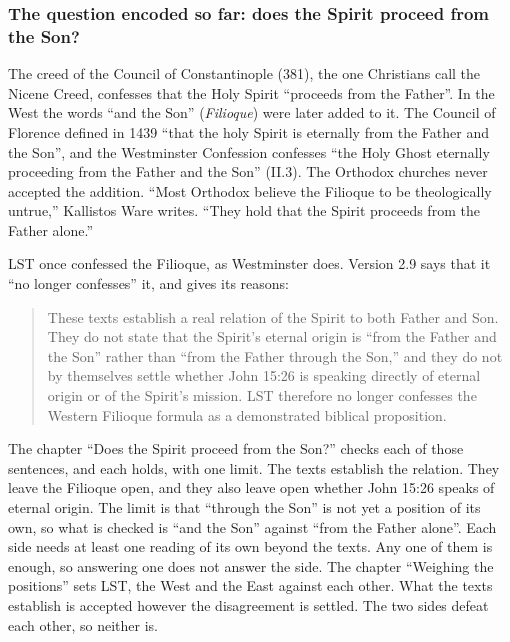 \documentclass[11pt,paper=\testimonypaper,DIV=13,parskip=false]{scrartcl}
\begin{document}
\subsubsection*{The question encoded so far: does the Spirit proceed from the Son?}
The creed of the Council of Constantinople (381), the one Christians call the Nicene Creed, confesses that the Holy Spirit “proceeds from the Father”. In the West the words “and the Son” (\emph{Filioque}) were later added to it. The Council of Florence defined in 1439 “that the holy Spirit is eternally from the Father and the Son”, and the Westminster Confession confesses “the Holy Ghost eternally proceeding from the Father and the Son” (II.3). The Orthodox churches never accepted the addition. “Most Orthodox believe the Filioque to be theologically untrue,” Kallistos Ware writes. “They hold that the Spirit proceeds from the Father alone.”

LST once confessed the Filioque, as Westminster does. Version 2.9 says that it “no longer confesses” it, and gives its reasons:

\begin{quote}
These texts establish a real relation of the Spirit to both Father and Son. They do not state that the Spirit’s eternal origin is “from the Father and the Son” rather than “from the Father through the Son,” and they do not by themselves settle whether John 15:26 is speaking directly of eternal origin or of the Spirit’s mission. LST therefore no longer confesses the Western Filioque formula as a demonstrated biblical proposition.

\end{quote}
The chapter “Does the Spirit proceed from the Son?” checks each of those sentences, and each holds, with one limit. The texts establish the relation. They leave the Filioque open, and they also leave open whether John 15:26 speaks of eternal origin. The limit is that “through the Son” is not yet a position of its own, so what is checked is “and the Son” against “from the Father alone”. Each side needs at least one reading of its own beyond the texts. Any one of them is enough, so answering one does not answer the side. The chapter “Weighing the positions” sets LST, the West and the East against each other. What the texts establish is accepted however the disagreement is settled. The two sides defeat each other, so neither is.
\end{document}
